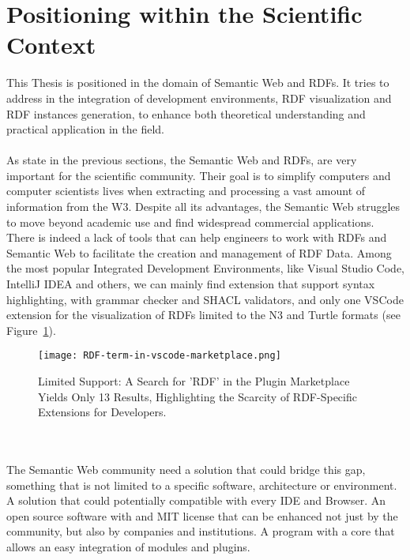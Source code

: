 \section{Positioning within the Scientific Context \label{sec:scope}}
This Thesis is positioned in the domain of Semantic Web and RDFs. It tries to address in the integration of development environments, RDF visualization and RDF instances generation, to enhance both theoretical understanding and practical application in the field.
\\
\\
As state in the previous sections, the Semantic Web and RDFs, are very important for the scientific community. Their goal is to simplify computers and computer scientists lives when extracting and processing a vast amount of information from the W3.
Despite all its advantages, the Semantic Web struggles to move beyond academic use and find widespread commercial applications. 
There is indeed a lack of tools that can help engineers to work with RDFs and Semantic Web to facilitate the creation and management of RDF Data. 
Among the most popular Integrated Development Environments, like Visual Studio Code, IntelliJ IDEA and others, we can mainly find extension that support syntax highlighting, with grammar checker and SHACL validators, and only one VSCode extension for the visualization of RDFs limited to the N3 and Turtle formats \cite{vscode_rdf_plugin,jetbrains_rdf_plugin,stackoverflow_survey_2024} (see Figure~\ref{fig:RDF-term-in-vscode-marketplace}).
\begin{figure}[htb]
  \centering
  \texttt{[image: RDF-term-in-vscode-marketplace.png]}\\
  \caption{Limited Support: A Search for 'RDF' in the Plugin Marketplace Yields Only 13 Results, Highlighting the Scarcity of RDF-Specific Extensions for Developers.}\label{fig:RDF-term-in-vscode-marketplace}
\end{figure}
\\
\\
The Semantic Web community need a solution that could bridge this gap, something that is not limited to a specific software, architecture or environment. A solution that could potentially compatible with every IDE and Browser. An open source software with and MIT license that can be enhanced not just by the community, but also by companies and institutions.
A program with a core that allows an easy integration of modules and plugins. 
\\
\\
